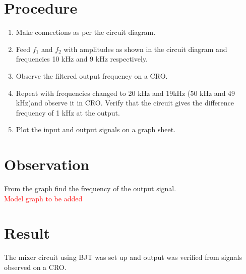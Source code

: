 \section*{Procedure}
\begin{enumerate}
\item
Make connections as per the circuit diagram.
\item
Feed $f_1$ and $f_2$ with amplitudes as shown in the circuit diagram and frequencies 10 kHz and 9 kHz respectively.
\item
Observe the filtered output frequency on a CRO.
\item
Repeat with frequencies changed to 20 kHz and 19kHz  (50 kHz and 49 kHz)and observe it in CRO. Verify that the circuit gives the difference frequency of 1 kHz at the output.
\item
Plot the input and output signals on a graph sheet. 

\end{enumerate}
\section*{Observation}
From the graph find the frequency of the output signal.\\
\textcolor{red}{Model graph to be added}
\section*{Result}
The mixer circuit using BJT was set up and output was verified from signals observed on a CRO.


